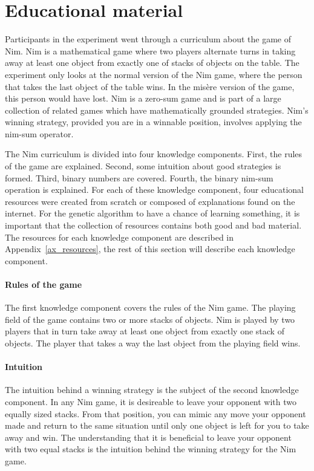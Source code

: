 \section{Educational material}
Participants in the experiment went through a curriculum about the game of Nim.
Nim is a mathematical game where two players alternate turns in taking away at
least one object from exactly one of stacks of objects on the table. The
experiment only looks at the normal version of the Nim game, where the person
that takes the last object of the table wins. In the mis\`{e}re version of the
game, this person would have lost. Nim is a zero-sum game and is part of a
large collection of related games which have mathematically grounded
strategies. Nim's winning strategy, provided you are in a winnable position,
involves applying the nim-sum operator. %

The Nim curriculum is divided into four knowledge components. First, the rules
of the game are explained. Second, some intuition about good strategies is formed.
Third, binary numbers are covered. Fourth, the binary nim-sum operation is
explained. For each of these knowledge component, four educational resources
were created from scratch or composed of explanations found on the internet.
For the genetic algorithm to have a chance of learning something, it is
important that the collection of resources contains both good and bad material.
The resources for each knowledge component are described in
Appendix~\ref{ax_resources}, the rest of this section will describe
each knowledge component.
\paragraph{Rules of the game} The first knowledge component covers the rules
of the Nim game. The playing field of the game contains two or more stacks of
objects. Nim is played by two players that in turn take away at least
one object from exactly one stack of objects. The player that takes a way the
last object from the playing field wins.
\paragraph{Intuition} The intuition behind a winning strategy is the subject
of the second knowledge component. In any Nim game, it is desireable to leave
your opponent with two equally sized stacks. From that position, you can mimic
any move your opponent made and return to the same situation until only one
object is left for you to take away and win. The understanding that it is
beneficial to leave your opponent with two equal stacks is the intuition behind
the winning strategy for the Nim game.
